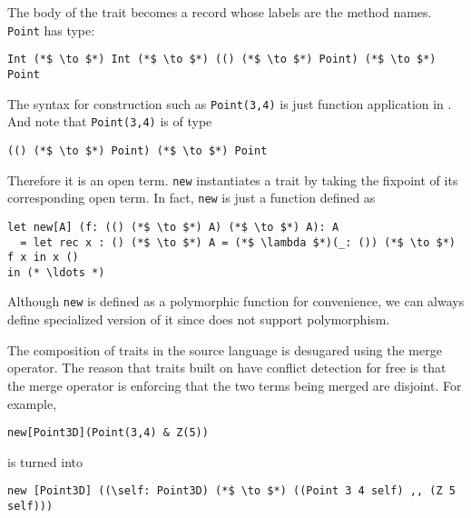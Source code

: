 The body of the trait becomes a record whose labels are the method names.
\lstinline$Point$ has type:

\begin{lstlisting}
Int (*$ \to $*) Int (*$ \to $*) (() (*$ \to $*) Point) (*$ \to $*) Point
\end{lstlisting}

The syntax for construction such as \lstinline$Point(3,4)$ is just function
application in \name. And note that \lstinline$Point(3,4)$ is of type
\begin{lstlisting}
(() (*$ \to $*) Point) (*$ \to $*) Point
\end{lstlisting}

Therefore it is an open term. \lstinline$new$ instantiates a trait by taking the
fixpoint of its corresponding open term. In fact, \lstinline$new$ is just a function defined as

\begin{lstlisting}
let new[A] (f: (() (*$ \to $*) A) (*$ \to $*) A): A
  = let rec x : () (*$ \to $*) A = (*$ \lambda $*)(_: ()) (*$ \to $*) f x in x ()
in (* \ldots *)
\end{lstlisting}

Although \lstinline$new$ is defined as
a polymorphic function for convenience, we can always define specialized version
of it since \name does not support polymorphism.

The composition of traits in the source language is desugared using the merge
operator. The reason that traits built on \name have conflict detection for free
is that the merge operator is enforcing that the two terms being merged are
disjoint. For example,

\begin{lstlisting}
new[Point3D](Point(3,4) & Z(5))
\end{lstlisting}

is turned into

\begin{lstlisting}
new [Point3D] ((\self: Point3D) (*$ \to $*) ((Point 3 4 self) ,, (Z 5 self)))
\end{lstlisting}

